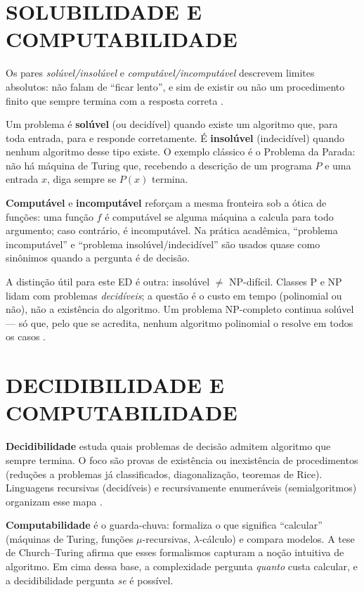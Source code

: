 \documentclass[
    12pt,
    oneside,
    a4paper,
    chapter=TITLE,
    section=TITLE,
    sumario=abnt-6027-2012
]{abntex2}
\begin{document}
\chapter{SOLUBILIDADE E COMPUTABILIDADE}
\label{cap:solu}

Os pares \textit{solúvel/insolúvel} e \textit{computável/incomputável} descrevem limites absolutos: não falam de ``ficar lento'', e sim de existir ou não um procedimento finito que sempre termina com a resposta correta \cite{sipser,papadimitriou}.

Um problema é \textbf{solúvel} (ou decidível) quando existe um algoritmo que, para toda entrada, para e responde corretamente. É \textbf{insolúvel} (indecidível) quando nenhum algoritmo desse tipo existe. O exemplo clássico é o Problema da Parada: não há máquina de Turing que, recebendo a descrição de um programa $P$ e uma entrada $x$, diga sempre se $P(x)$ termina.

\textbf{Computável} e \textbf{incomputável} reforçam a mesma fronteira sob a ótica de funções: uma função $f$ é computável se alguma máquina a calcula para todo argumento; caso contrário, é incomputável. Na prática acadêmica, ``problema incomputável'' e ``problema insolúvel/indecidível'' são usados quase como sinônimos quando a pergunta é de decisão.

A distinção útil para este ED é outra: insolúvel $\neq$ NP-difícil. Classes P e NP lidam com problemas \textit{decidíveis}; a questão é o custo em tempo (polinomial ou não), não a existência do algoritmo. Um problema NP-completo continua solúvel --- só que, pelo que se acredita, nenhum algoritmo polinomial o resolve em todos os casos \cite{garey}.

\chapter{DECIDIBILIDADE E COMPUTABILIDADE}
\label{cap:areas}

\textbf{Decidibilidade} estuda quais problemas de decisão admitem algoritmo que sempre termina. O foco são provas de existência ou inexistência de procedimentos (reduções a problemas já classificados, diagonalização, teoremas de Rice). Linguagens recursivas (decidíveis) e recursivamente enumeráveis (semialgoritmos) organizam esse mapa \cite{sipser}.

\textbf{Computabilidade} é o guarda-chuva: formaliza o que significa ``calcular'' (máquinas de Turing, funções $\mu$-recursivas, $\lambda$-cálculo) e compara modelos. A tese de Church--Turing afirma que esses formalismos capturam a noção intuitiva de algoritmo. Em cima dessa base, a complexidade pergunta \textit{quanto} custa calcular, e a decidibilidade pergunta \textit{se} é possível.
\end{document}

